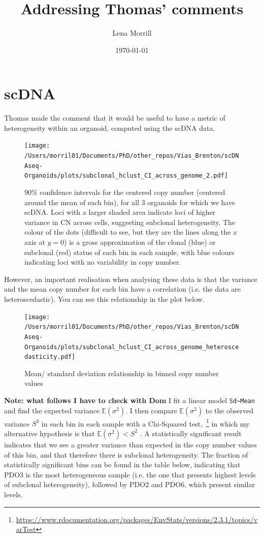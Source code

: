 \documentclass{article}
\author{Lena Morrill}
\date{\today}
\title{Addressing Thomas' comments}
\begin{document}
\maketitle

\tableofcontents

\section{scDNA}

Thomas made the comment that it would be useful to have a metric of heterogeneity within an organoid, computed using the scDNA data.

\begin{figure}[h]
\texttt{[image: /Users/morril01/Documents/PhD/other\_repos/Vias\_Brenton/scDNAseq-Organoids/plots/subclonal\_hclust\_CI\_across\_genome\_2.pdf]}
\caption{90\% confidence intervals for the centered copy number (centered around the mean of each bin), for all 3 organoids for which we have scDNA. Loci with a larger shaded area indicate loci of higher variance in CN across cells, suggesting subclonal heterogeneity. The colour of the dots (difficult to see, but they are the lines along the $x$ axis at $y=0$) is a gross approximation of the clonal (blue) or subclonal (red) status of each bin in each sample, with blue colours indicating loci with no variability in copy number. }
\end{figure}

However, an important realisation when analysing these data is that the variance and the mean copy number for each bin have a correlation (i.e. the data are heteroscedastic). You can see this relationship in the plot below.

\clearpage

\begin{figure}[h]
\centering
\texttt{[image: /Users/morril01/Documents/PhD/other\_repos/Vias\_Brenton/scDNAseq-Organoids/plots/subclonal\_hclust\_CI\_across\_genome\_heteroscedasticity.pdf]}
\caption{Mean/ standard deviation relationship in binned copy number values}
\end{figure}

\textbf{Note: what follows I have to check with Dom} I fit a linear model \verb|Sd~Mean| and find the expected variance $\mathds{E}(\sigma^2)$. I then compare $\mathds{E}(\sigma^2)$ to the observed variance $S^2$ in each bin in each sample with a Chi-Squared test,~\footnote{\url{https://www.rdocumentation.org/packages/EnvStats/versions/2.3.1/topics/varTest}} in which my alternative hypothesis is that $\mathds{E}(\sigma^2) < S^2$ . A statistically significant result indicates that we see a greater variance than expected in the copy number values of this bin, and that therefore there is subclonal heterogeneity. The fraction of statistically significant bins can be found in the table below, indicating that PDO3 is the most heterogeneous sample (i.e. the one that presents highest levels of subclonal heterogeneity), followed by PDO2 and PDO6, which present similar levels.
\end{document}

